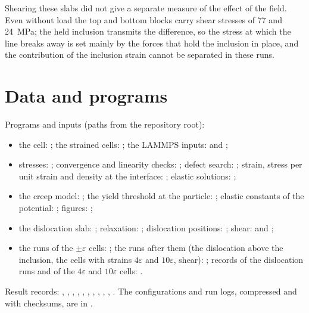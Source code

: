 \documentclass[11pt,a4paper]{article}
\begin{document}
Shearing these slabs did not give a separate measure of the effect of the
field. Even without load the top and bottom blocks carry shear stresses of
77 and 24~MPa; the held inclusion transmits the difference,
so the stress at which the line breaks away is set mainly by the forces that
hold the inclusion in place, and the contribution of the inclusion strain
cannot be separated in these runs.

\section{Data and programs}
\sloppy

Programs and inputs (paths from the repository root):
\begin{itemize}
\item the cell: ; the strained
cells: ; the LAMMPS inputs:
 and
;
\item stresses: ;
convergence and linearity checks: ;
defect search: ; strain, stress per
unit strain and density at the interface:
;
elastic solutions: ;
\item the creep model: ; the yield
threshold at the particle: ; elastic
constants of the potential: ;
figures: ;
\item the dislocation slab: ;
relaxation: ; dislocation
positions: ; shear:
 and
;
\item the runs of the $\pm\varepsilon$ cells: ;
the runs after them (the dislocation above the inclusion, the cells with
strains $4\varepsilon$ and $10\varepsilon$, shear): ;
records of the dislocation runs and of the $4\varepsilon$ and $10\varepsilon$
cells: .
\end{itemize}
Result records: ,
, ,
, ,
, ,
, ,
,
. The configurations and run
logs, compressed and with checksums, are in .



\end{document}
